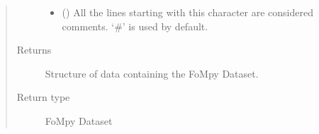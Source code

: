 \documentclass[letterpaper,10pt,english,openany, oneside]{sphinxmanual}
\begin{document}
\begin{fulllineitems}
\begin{quote}
\begin{description}
\begin{itemize}
\item {} 
 () \textendash{} All the lines starting with this character are considered comments.
‘\#’ is used by default.

\end{itemize}

\item[{Returns}] \leavevmode
{} \textendash{} Structure of data containing the FoMpy Dataset.

\item[{Return type}] \leavevmode
FoMpy Dataset

\end{description}\end{quote}

\end{fulllineitems}

\end{document}
